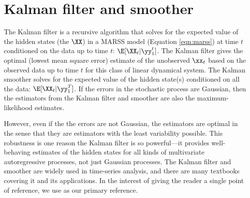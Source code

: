 \section{Kalman filter and smoother}\label{sec:kalmanfilter}

The Kalman filter \citep{Kalman1960} is a recursive algorithm that solves for the expected value of the hidden states (the $\XX$) in a MARSS model (Equation \ref{eqn:marss}) at time $t$ conditioned on the data up to time $t$: $\E[\XX_t|\yy_1^t]$.  The Kalman filter gives the optimal (lowest mean square error) estimate of the unobserved $\xx_t$ based on the observed data up to time $t$ for this class of linear dynamical system.  The Kalman smoother \citep{Rauchetal1965} solves for the expected value of the hidden state(s) conditioned on all the data: $\E[\XX_t|\yy_1^T]$.  If the errors in the stochastic process are Gaussian, then the estimators from the Kalman filter and smoother are also the maximum-likelihood estimates.  

However, even if the the errors are not Gaussian, the estimators are optimal in the sense that they are estimators with the least variability possible.  This robustness is one reason the Kalman filter is so powerful---it provides well-behaving estimates of the hidden states for all kinds of multivariate autoregressive processes, not just Gaussian processes.  The Kalman filter and smoother are widely used in time-series analysis, and there are many textbooks covering it and its applications.  In the interest of giving the reader a single point of reference, we use \citet{ShumwayStoffer2006} as our primary reference.  

